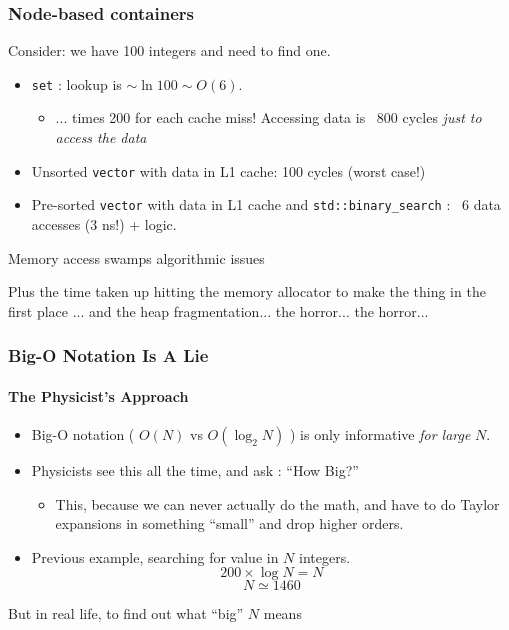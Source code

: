 \begin{frame}[fragile]
\frametitle{Node-based containers}

Consider: we have 100 integers and need to find one.

\begin{itemize}
\item \texttt{set} : lookup is $\sim \ln 100 \sim  O(6)$.
  \begin{itemize}
  \item ... times 200 for each cache miss!  Accessing data is ~800
    cycles \emph{just to access the data}
    \end{itemize}
\item Unsorted \texttt{vector} with data in L1 cache: 100 cycles (worst
  case!)
\item Pre-sorted \texttt{vector} with data in L1 cache and
  \texttt{std::binary\_search} : ~6 data accesses (3 ns!) + logic.
\end{itemize}

\vskip 12pt

\begin{block}{Memory access swamps algorithmic issues}
\end{block}

\begin{alertblock}{Plus the time taken up hitting the memory allocator
  to make the thing in the first place}
 ... and the heap fragmentation... the horror... the horror...
\end{alertblock}
\end{frame}


\begin{frame}[fragile]
\frametitle{Big-O Notation Is A Lie}
\framesubtitle{The Physicist's Approach}
\begin{itemize}[<+->]
\item Big-O notation ( $O(N)$ vs $O(\log_2 N)$ ) is only informative
  \emph{for large} $N$.
\item Physicists see this all the time, and ask : ``How Big?''
  \begin{itemize}
    \item This, because we can never actually do the math, and have to
      do Taylor expansions in something ``small'' and drop higher
      orders.
  \end{itemize}
\item Previous example, searching for value in $N$ integers.
\begin{equation*}
200 \times \log N = N 
\end{equation*}
\begin{equation*}
N \simeq 1460
\end{equation*}
\end{itemize}
\pause{}
\begin{center}
But in real life,  to find out what ``big'' $N$
means
\end{center}
\end{frame}


